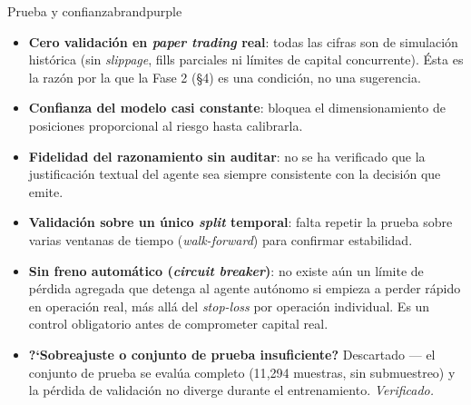 \documentclass[11pt]{article}
\begin{document}
\vspace{0.5em}
\noindent
\begin{minipage}{0.485\linewidth}
\begin{riskpanel}{Prueba y confianza}{brandpurple}
\begin{itemize}
\item \textbf{Cero validaci\'on en \textit{paper trading} real}: todas las cifras son de simulaci\'on hist\'orica (sin \textit{slippage}, fills parciales ni l\'imites de capital concurrente). \'Esta es la raz\'on por la que la Fase 2 (\S4) es una condici\'on, no una sugerencia.
\item \textbf{Confianza del modelo casi constante}: bloquea el dimensionamiento de posiciones proporcional al riesgo hasta calibrarla.
\item \textbf{Fidelidad del razonamiento sin auditar}: no se ha verificado que la justificaci\'on textual del agente sea siempre consistente con la decisi\'on que emite.
\item \textbf{Validaci\'on sobre un \'unico \textit{split} temporal}: falta repetir la prueba sobre varias ventanas de tiempo (\textit{walk-forward}) para confirmar estabilidad.
\item \textbf{Sin freno autom\'atico (\textit{circuit breaker})}: no existe a\'un un l\'imite de p\'erdida agregada que detenga al agente aut\'onomo si empieza a perder r\'apido en operaci\'on real, m\'as all\'a del \textit{stop-loss} por operaci\'on individual. Es un control obligatorio antes de comprometer capital real.
\item \textbf{?`Sobreajuste o conjunto de prueba insuficiente?} Descartado --- el conjunto de prueba se eval\'ua completo (11{,}294 muestras, sin submuestreo) y la p\'erdida de validaci\'on no diverge durante el entrenamiento. \textit{Verificado.}
\end{itemize}
\end{riskpanel}
\end{minipage}\hfill
\end{document}
